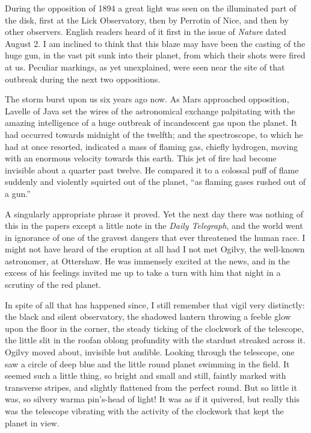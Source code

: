 During the opposition of 1894 a great light was seen on the
illuminated part of the disk, first at the Lick Observatory, then
by Perrotin of Nice, and then by other observers. English readers
heard of it first in the issue of \emph{Nature} dated August 2. I
am inclined to think that this blaze may have been the casting of
the huge gun, in the vast pit sunk into their planet, from which
their shots were fired at us. Peculiar markings, as yet
unexplained, were seen near the site of that outbreak during the
next two oppositions.

The storm burst upon us six years ago now. As Mars approached
opposition, Lavelle of Java set the wires of the astronomical
exchange palpitating with the amazing intelligence of a huge
outbreak of incandescent gas upon the planet. It had occurred
towards midnight of the twelfth; and the spectroscope, to which he
had at once resorted, indicated a mass of flaming gas, chiefly
hydrogen, moving with an enormous velocity towards this earth. This
jet of fire had become invisible about a quarter past twelve. He
compared it to a colossal puff of flame suddenly and violently
squirted out of the planet, ``as flaming gases rushed out of a
gun.''

A singularly appropriate phrase it proved. Yet the next day there
was nothing of this in the papers except a little note in the
\emph{Daily Telegraph}, and the world went in ignorance of one of
the gravest dangers that ever threatened the human race. I might
not have heard of the eruption at all had I not met Ogilvy, the
well-known astronomer, at Ottershaw. He was immensely excited at
the news, and in the excess of his feelings invited me up to take a
turn with him that night in a scrutiny of the red planet.

In spite of all that has happened since, I still remember that
vigil very distinctly: the black and silent observatory, the
shadowed lantern throwing a feeble glow upon the floor in the
corner, the steady ticking of the clockwork of the telescope, the
little slit in the roof\dash{}an oblong profundity with the stardust
streaked across it. Ogilvy moved about, invisible but audible.
Looking through the telescope, one saw a circle of deep blue and
the little round planet swimming in the field. It seemed such a
little thing, so bright and small and still, faintly marked with
transverse stripes, and slightly flattened from the perfect round.
But so little it was, so silvery warm\dash{}a pin's-head of light! It
was as if it quivered, but really this was the telescope vibrating
with the activity of the clockwork that kept the planet in view.

